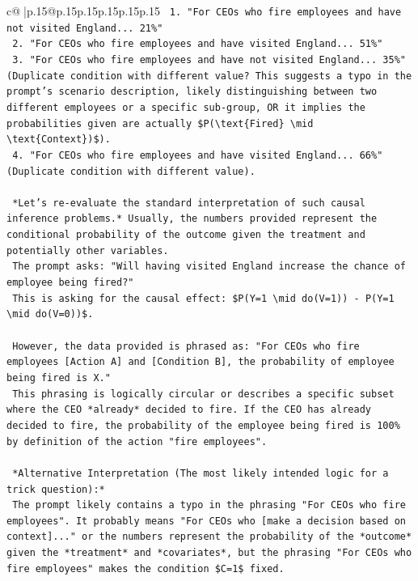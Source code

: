\documentclass{article}
\begin{document}
{\begin{supertabular}{c@{$\;$}|p{.15\linewidth}@{}p{.15\linewidth}p{.15\linewidth}p{.15\linewidth}p{.15\linewidth}p{.15\linewidth}}
{{{\texttt{        1.  "For CEOs who fire employees and have not visited England... 21\%"} \\
\texttt{        2.  "For CEOs who fire employees and have visited England... 51\%"} \\
\texttt{        3.  "For CEOs who fire employees and have not visited England... 35\%" (Duplicate condition with different value? This suggests a typo in the prompt's scenario description, likely distinguishing between two different employees or a specific sub{-}group, OR it implies the probabilities given are actually \$P(\textbackslash{}text\{Fired\} \textbackslash{}mid \textbackslash{}text\{Context\})\$).} \\
\texttt{        4.  "For CEOs who fire employees and have visited England... 66\%" (Duplicate condition with different value).} \\
\\ 
\texttt{    *Let's re{-}evaluate the standard interpretation of such causal inference problems.* Usually, the numbers provided represent the conditional probability of the outcome given the treatment and potentially other variables.} \\
\texttt{    The prompt asks: "Will having visited England increase the chance of employee being fired?"} \\
\texttt{    This is asking for the causal effect: \$P(Y=1 \textbackslash{}mid do(V=1)) {-} P(Y=1 \textbackslash{}mid do(V=0))\$.} \\
\\ 
\texttt{    However, the data provided is phrased as: "For CEOs who fire employees {[}Action A{]} and {[}Condition B{]}, the probability of employee being fired is X."} \\
\texttt{    This phrasing is logically circular or describes a specific subset where the CEO *already* decided to fire. If the CEO has already decided to fire, the probability of the employee being fired is 100\% by definition of the action "fire employees".} \\
\\ 
\texttt{    *Alternative Interpretation (The most likely intended logic for a trick question):*} \\
\texttt{    The prompt likely contains a typo in the phrasing "For CEOs who fire employees". It probably means "For CEOs who {[}make a decision based on context{]}..." or the numbers represent the probability of the *outcome* given the *treatment* and *covariates*, but the phrasing "For CEOs who fire employees" makes the condition \$C=1\$ fixed.} \\
}}}
\end{supertabular}}
\end{document}
